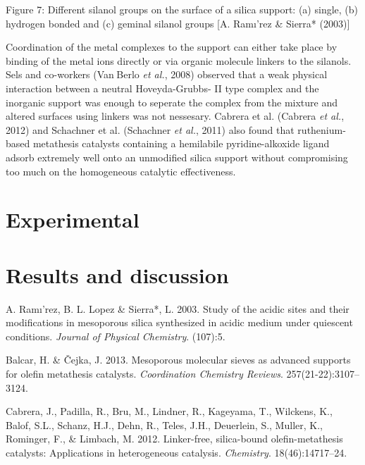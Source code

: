 \documentclass[]{article}
\begin{document}
Figure 7: Different silanol groups on the surface of a silica support:
(a) single, (b) hydrogen bonded and (c) geminal silanol groups {[}A.
Ramı'rez \& Sierra* (2003){]}

Coordination of the metal complexes to the support can either take place
by binding of the metal ions directly or via organic molecule linkers to
the silanols. Sels and co-workers (Van Berlo \emph{et al.}, 2008)
observed that a weak physical interaction between a neutral
Hoveyda-Grubbs- II type complex and the inorganic support was enough to
seperate the complex from the mixture and altered surfaces using linkers
was not nessesary. Cabrera et al. (Cabrera \emph{et al.}, 2012) and
Schachner et al. (Schachner \emph{et al.}, 2011) also found that
ruthenium-based metathesis catalysts containing a hemilabile
pyridine-alkoxide ligand adsorb extremely well onto an unmodified silica
support without compromising too much on the homogeneous catalytic
effectiveness.

\hypertarget{experimental}{%
\section{Experimental}\label{experimental}}

\hypertarget{results-and-discussion}{%
\section{Results and discussion}\label{results-and-discussion}}

\listoffigures

\hypertarget{refs}{}
\leavevmode\hypertarget{ref-RN75}{}%
A. Ramı'rez, B. L. Lopez \& Sierra*, L. 2003. Study of the acidic sites
and their modifications in mesoporous silica synthesized in acidic
medium under quiescent conditions. \emph{Journal of Physical Chemistry}.
(107):5.

\leavevmode\hypertarget{ref-RN44}{}%
Balcar, H. \& Čejka, J. 2013. Mesoporous molecular sieves as advanced
supports for olefin metathesis catalysts. \emph{Coordination Chemistry
Reviews}. 257(21-22):3107--3124.

\leavevmode\hypertarget{ref-RN84}{}%
Cabrera, J., Padilla, R., Bru, M., Lindner, R., Kageyama, T., Wilckens,
K., Balof, S.L., Schanz, H.J., Dehn, R., Teles, J.H., Deuerlein, S.,
Muller, K., Rominger, F., \& Limbach, M. 2012. Linker-free, silica-bound
olefin-metathesis catalysts: Applications in heterogeneous catalysis.
\emph{Chemistry}. 18(46):14717--24.
\end{document}
